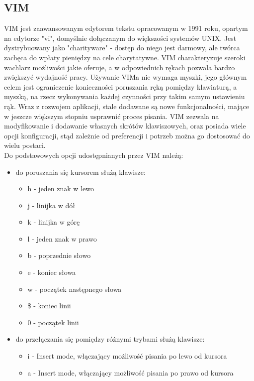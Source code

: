 \documentclass[12pt, a4paper]{article}
\begin{document}
\begin{sloppypar}
{  \subsection{VIM}
  {
    VIM jest zaawansowanym edytorem tekstu opracowanym w 1991 roku, opartym na edytorze
    "vi", domyślnie dołączanym do większości systemów UNIX. Jest dystrybuowany jako
    "charityware" - dostęp do niego jest darmowy, ale twórca zachęca do wpłaty pieniędzy
    na cele charytatywne. VIM charakteryzuje szeroki wachlarz możliwości jakie oferuje,
    a w odpowiednich rękach pozwala bardzo zwiększyć wydajność pracy. Używanie VIMa
    nie wymaga myszki, jego głównym celem jest ograniczenie konieczności poruszania ręką
    pomiędzy klawiaturą, a myszką, na rzecz wykonywania każdej czynności przy takim samym
    ustawieniu rąk. Wraz z rozwojem aplikacji, stale dodawane są nowe funkcjonalności,
    mające w jeszcze większym stopniu usprawnić proces pisania. VIM zezwala na
    modyfikowanie i dodawanie własnych skrótów klawiszowych, oraz posiada wiele opcji
    konfiguracji, stąd zależnie od preferencji i potrzeb można go dostosować do wielu
    postaci.\\
    Do podstawowych opcji udostępnianych przez VIM należą:
    \begin{itemize}
      \item do poruszania się kursorem służą klawisze:
      \begin{itemize}
        \item h - jeden znak w lewo
        \item j - linijka w dół
        \item k - linijka w górę
        \item l - jeden znak w prawo
        \item b - poprzednie słowo
        \item e - koniec słowa
        \item w - początek następnego słowa
        \item \$ - koniec linii 
        \item 0 - początek linii
      \end{itemize}
      \item do przełączania się pomiędzy różnymi trybami służą klawisze:
      \begin{itemize}
        \item i - Insert mode, włączający możliwość pisania po lewo od kursora
        \item a - Insert mode, włączający możliwość pisania po prawo od kursora

\end{itemize}
\end{itemize}}}
\end{sloppypar}
\end{document}

